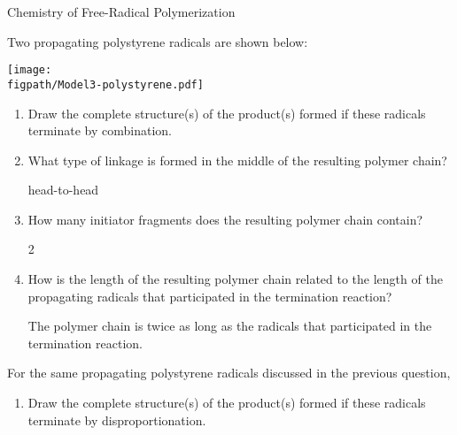 \begin{activity}{Chemistry of Free-Radical Polymerization}
\begin{ctqs}
	\question Two propagating polystyrene radicals are shown below:
	
			\centerline{\texttt{[image: \\figpath/Model3-polystyrene.pdf]}}
	
		\begin{enumerate}
			\item Draw the complete structure(s) of the product(s) formed if these radicals terminate by combination.
	
				\begin{solution}[1.25in]\end{solution}
			
			\item What type of linkage is formed in the middle of the resulting polymer chain?
	
				\begin{solution}[0.25in]
					head-to-head
				\end{solution}
			
			\item How many initiator fragments does the resulting polymer chain contain?
	
				\begin{solution}[0.25in]
					2
				\end{solution}
			
			\item How is the length of the resulting polymer chain related to the length of the propagating radicals that participated in the termination reaction?
	
				\begin{solution}[0.5in]
					The polymer chain is twice as long as the radicals that participated in the termination reaction.
				\end{solution}
				
		\end{enumerate}
		
	\question For the same propagating polystyrene radicals discussed in the previous question,
	
		\begin{enumerate}
			\item Draw the complete structure(s) of the product(s) formed if these radicals terminate by disproportionation.
	
				\begin{solution}[1.5in]\end{solution}
			

\end{enumerate}
\end{ctqs}
\end{activity}
